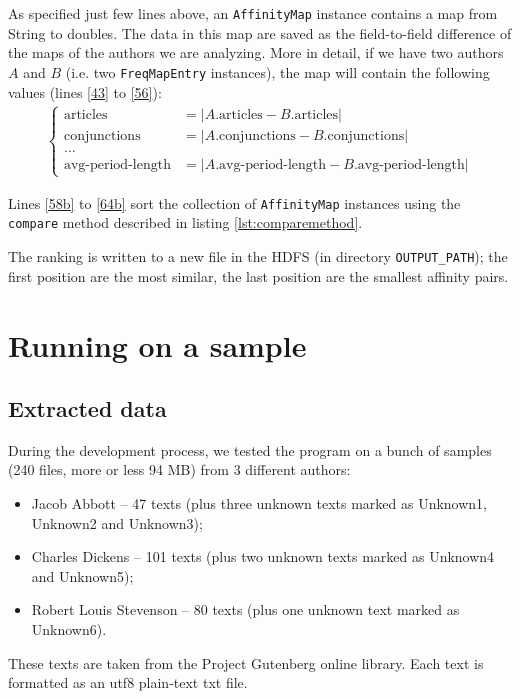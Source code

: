 \documentclass[a4paper,11pt, twoside]{article}
\begin{document}
 	\bigskip
 	\noindent
	As specified just few lines above, an \lstinline|AffinityMap| instance contains a map from String to doubles. The data in this map are saved as the field-to-field difference of the maps of the authors we are analyzing. More in detail, if we have two authors $A$ and $B$ (i.e. two \lstinline|FreqMapEntry| instances), the map will contain the following values (lines \ref{43} to \ref{56}):
	\begin{align*}
		\begin{cases}
			\text{articles} &= |A.\text{articles} - B.\text{articles}| \\
			\text{conjunctions} &= |A. \text{conjunctions}- B.\text{conjunctions}| \\
			\dots& \\
			\text{avg-period-length}&= |A.\text{avg-period-length} - B.\text{avg-period-length}|
		\end{cases}
	\end{align*}
	
	\noindent
	Lines \ref{58b} to \ref{64b} sort the collection of \lstinline|AffinityMap| instances using the \lstinline|compare| method described in listing \ref{lst:comparemethod}.
	
	\noindent
	The ranking is written to a new file in the HDFS (in directory \lstinline|OUTPUT_PATH|); the first position are the most similar, the last position are the smallest affinity pairs.
	
	\newpage
	\section{Running on a sample}\label{sample}
	\subsection{Extracted data}
	During the development process, we tested the program on a bunch of samples (240 files, more or less 94 MB) from 3 different authors: 
	\begin{itemize}
		\item Jacob Abbott -- 47 texts (plus three unknown texts marked as Unknown1, Unknown2 and Unknown3);
		\item Charles Dickens -- 101 texts (plus two unknown texts marked as Unknown4 and Unknown5);
		\item Robert Louis Stevenson -- 80 texts (plus one unknown text marked as Unknown6).
	\end{itemize}

		\noindent
		These texts are taken from the Project Gutenberg online library. Each text is formatted as an utf8 plain-text txt file.
\end{document}
